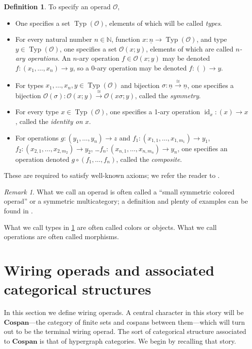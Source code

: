 \documentclass[11pt, article, oneside]{memoir}
\theoremstyle{plain}
\theoremstyle{definition}
\newtheorem{definition}[theorem]{Definition}
\theoremstyle{remark}
\newtheorem{remark}[theorem]{Remark}
\newcommand{\cat}[1]{\mathcal{#1}}
\newcommand{\Cat}[1]{\mathbf{#1}}
\DeclareMathOperator{\id}{id}
\DeclareMathOperator{\Typ}{Typ}
\newcommand{\NN}{\mathbb{N}}
\newcommand{\To}[1]{\xrightarrow{#1}}
\newcommand{\ul}[1]{\underline{#1}}
\newcommand{\Cospan}{\Cat{Cospan}}
\newcommand{\OO}{\cat{O}}
\begin{document}
\begin{definition}\label{def.operad}
To specify an operad $\OO$,
\begin{itemize}
	\item One specifies a set $\Typ(\OO)$, elements of which will be called \emph{types}.
	\item For every natural number $n\in\NN$, function $x\colon\ul{n}\to\Typ(\OO)$, and type $y\in\Typ(\OO)$, one specifies a set $\OO(x;y)$, elements of which are called \emph{$n$-ary operations}. An $n$-ary operation $f\in\OO(x;y)$ may be denoted $f\colon(x_1,\ldots,x_n)\to y$, so a $0$-ary operation may be denoted $f\colon()\to y$.
	\item For types $x_1,\ldots,x_n,y\in\Typ(\OO)$ and bijection $\sigma\colon\ul{n}\To{\cong}\ul{n}$, one specifies a bijection $\OO(\sigma)\colon\OO(x;y)\To\cong\OO(x\sigma;y)$, called the \emph{symmetry}.
	\item For every type $x\in\Typ(\OO)$, one specifies a 1-ary operation $\id_x\colon(x)\to x$, called the \emph{identity on $x$}.
	\item For operations $g\colon(y_1,\ldots,y_n)\to z$ and $f_1\colon(x_{1,1},\ldots,x_{1,m_1})\to y_1$, $f_2\colon(x_{2,1},\ldots,x_{2,m_2})\to y_2$, \ldots $f_n\colon(x_{n,1},\ldots,x_{n,m_n})\to y_n$, one specifies an operation denoted $g\circ(f_1,\ldots,f_n)$, called the \emph{composite}.
\end{itemize}
These are required to satisfy well-known axioms; we refer the reader to \cite[Definition 2.2.21(?)]{Leinster:2004a}.
\end{definition}

\begin{remark}
What we call an operad is often called a ``small symmetric colored operad'' or a symmetric multicategory; a definition and plenty of examples can be found in \cite{Leinster:2004a}.

What we call types in \cref{def.operad} are often called colors or objects. What we call operations are often called morphisms.
\end{remark}

\chapter{Wiring operads and associated categorical structures}

In this section we define wiring operads. A central character in this story will be $\Cospan$---the category of finite sets and cospans between them---which will turn out to be the terminal wiring operad. The sort of categorical structure associated to $\Cospan$ is that of hypergraph categories. We begin by recalling that story.
\end{document}
